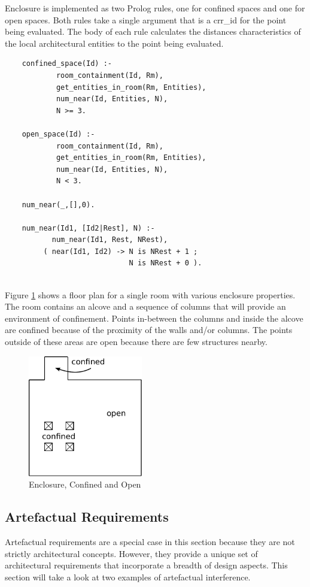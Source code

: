 \documentclass[12pt]{ucthesis}
\begin{document}
Enclosure is implemented as two Prolog rules, one for confined spaces and one for open spaces. Both rules take a single argument that is a crr\_id for the point being evaluated. The body of each rule calculates the distances characteristics of the local architectural entities to the point being evaluated.
\begin{verbatim}
    confined_space(Id) :-
            room_containment(Id, Rm),
            get_entities_in_room(Rm, Entities),
            num_near(Id, Entities, N),
            N >= 3.            
            
    open_space(Id) :-
            room_containment(Id, Rm),
            get_entities_in_room(Rm, Entities),
            num_near(Id, Entities, N),  
            N < 3.

    num_near(_,[],0).

    num_near(Id1, [Id2|Rest], N) :-
           num_near(Id1, Rest, NRest),
         ( near(Id1, Id2) -> N is NRest + 1 ;
                             N is NRest + 0 ).


\end{verbatim} 

Figure \ref{enclosure} shows a floor plan for a single room with various enclosure properties. The room contains an alcove and a sequence of columns that will provide an environment of confinement. Points in-between the columns and inside the alcove are confined because of the proximity of the walls and/or columns. The points outside of these areas are open because there are few structures nearby.

\begin{figure}[t]
\centering
\includegraphics[width=50mm]{spacious-confined}
\caption{Enclosure, Confined and Open}
\label{enclosure}
\end{figure}


\subsection{Artefactual Requirements}
Artefactual requirements are a special case in this section because they are not strictly architectural concepts. However, they provide a unique set of architectural requirements that incorporate a breadth of design aspects. This section will take a look at two examples of artefactual interference. 
\end{document}

